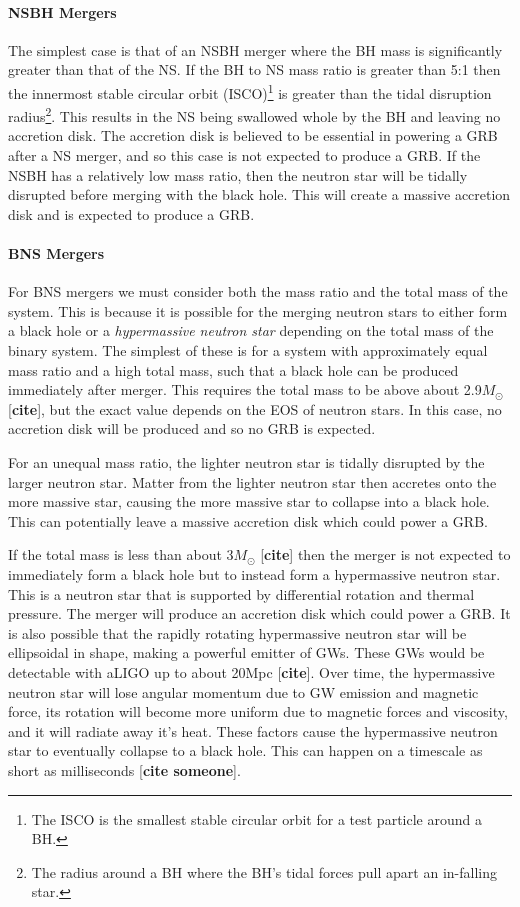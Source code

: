 \documentclass[11pt]{cuthesis}
\begin{document}
\paragraph{NSBH Mergers} The simplest case is that of an NSBH merger where the BH mass is significantly greater than that of the NS. If the BH to NS mass ratio is greater than 5:1 then the innermost stable circular orbit (ISCO)\footnote{The ISCO is the smallest stable circular orbit for a test particle around a BH.} is greater than the tidal disruption radius\footnote{The radius around a BH where the BH's tidal forces pull apart an in-falling star.}. This results in the NS being swallowed whole by the BH and leaving no accretion disk. The accretion disk is believed to be essential in powering a GRB after a NS merger, and so this case is not expected to produce a GRB. If the NSBH has a relatively low mass ratio, then the neutron star will be tidally disrupted before merging with the black hole. This will create a massive accretion disk and is expected to produce a GRB. 

\paragraph{BNS Mergers} For BNS mergers we must consider both the mass ratio and the total mass of the system. This is because it is possible for the merging neutron stars to either form a black hole or a \textit{hypermassive neutron star} depending on the total mass of the binary system. The simplest of these is for a system with approximately equal mass ratio and a high total mass, such that a black hole can be produced immediately after merger. This requires the total mass to be above about 2.9$M_\odot$ [\textbf{cite}], but the exact value depends on the EOS of neutron stars. In this case, no accretion disk will be produced and so no GRB is expected. 

For an unequal mass ratio, the lighter neutron star is tidally disrupted by the larger neutron star. Matter from the lighter neutron star then accretes onto the more massive star, causing the more massive star to collapse into a black hole. This can potentially leave a massive accretion disk which could power a GRB.  

If the total mass is less than about 3$M_\odot$ [\textbf{cite}] then the merger is not expected to immediately form a black hole but to instead form a hypermassive neutron star. This is a neutron star that is supported by differential rotation and thermal pressure. The merger will produce an accretion disk which could power a GRB. It is also possible that the rapidly rotating hypermassive neutron star will be ellipsoidal in shape, making a powerful emitter of GWs. These GWs would be detectable with aLIGO up to about 20Mpc [\textbf{cite}]. Over time, the hypermassive neutron star will lose angular momentum due to GW emission and magnetic force, its rotation will become more uniform due to magnetic forces and viscosity, and it will radiate away it's heat. These factors cause the hypermassive neutron star to eventually collapse to a black hole. This can happen on a timescale as short as milliseconds [\textbf{cite someone}]. 
\end{document}
